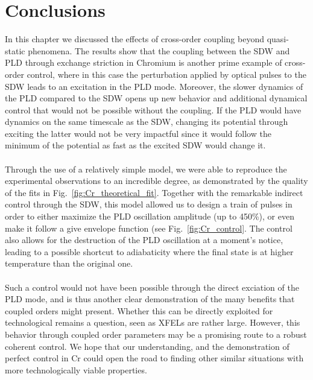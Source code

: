 \section{Conclusions}
In this chapter we discussed the effects of cross-order coupling beyond quasi-static phenomena.
The results show that the coupling between the SDW and PLD through exchange striction in Chromium is another prime example of cross-order control, where in this case the perturbation applied by optical pulses to the SDW leads to an excitation in the PLD mode.
Moreover, the slower dynamics of the PLD compared to the SDW opens up new behavior and additional dynamical control that would not be possible without the coupling.
If the PLD would have dynamics on the same timescale as the SDW, changing its potential through exciting the latter would not be very impactful since it would follow the minimum of the potential as fast as the excited SDW would change it.
\\\\
Through the use of a relatively simple model, we were able to reproduce the experimental observations to an incredible degree, as demonstrated by the quality of the fits in Fig.~\ref{fig:Cr_theoretical_fit}.
Together with the remarkable indirect control through the SDW, this model allowed us to design a train of pulses in order to either maximize the PLD oscillation amplitude (up to 450\%), or even make it follow a give envelope function (see Fig.~\ref{fig:Cr_control}.
The control also allows for the destruction of the PLD oscillation at a moment's notice, leading to a possible shortcut to adiabaticity where the final state is at higher temperature than the original one.
\\\\
Such a control would not have been possible through the direct exciation of the PLD mode, and is thus another clear demonstration of the many benefits that coupled orders might present.
Whether this can be directly exploited for technological remains a question, seen as XFELs are rather large.
However, this behavior through coupled order parameters may be a promising route to a robust coherent control.
We hope that our understanding, and the demonstration of perfect control in Cr could open the road to finding other similar situations with more technologically viable properties.   
